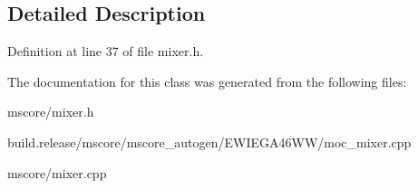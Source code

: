 \subsection{Detailed Description}


Definition at line 37 of file mixer.\+h.



The documentation for this class was generated from the following files\+:\begin{DoxyCompactItemize}
\item 
mscore/mixer.\+h\item 
build.\+release/mscore/mscore\+\_\+autogen/\+E\+W\+I\+E\+G\+A46\+W\+W/moc\+\_\+mixer.\+cpp\item 
mscore/mixer.\+cpp\end{DoxyCompactItemize}
